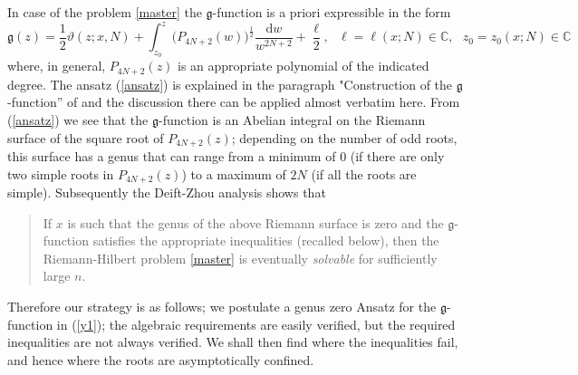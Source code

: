 \documentclass[10pt,reqno,oneside]{amsart}
\def \gg{{\mathfrak g}}
\renewcommand{\d}{{\mathrm d}}
\numberwithin{equation}{section}
\def\eqref#1{(\ref{#1})}
\begin{document}
In case of the problem \ref{master} the $\gg$-function is a priori expressible in the form 
\begin{equation}\label{ansatz}
	\gg(z) = \frac 12 \vartheta(z;x,N) + \int_{z_0} ^z \big(P_{4N+2}(w)\big)^{\frac{1}{2}}\frac{\d w}{w^{2N+2}}+\frac{\ell}{2},\ \ \ \ell=\ell(x;N)\in\mathbb{C},\ \ \ z_0=z_0(x;N)\in\mathbb{C}
\end{equation}
where, in general, $P_{4N+2}(z)$ is an appropriate polynomial of the indicated degree. The ansatz \eqref{ansatz} is explained in the paragraph "Construction of the $\gg$-function'' of \cite{BB} and the discussion there can be applied almost verbatim here. From \eqref{ansatz} we see that the $\gg$-function is an Abelian integral on the Riemann surface of the square root of $P_{4N+2}(z)$; depending on the number of odd roots, this surface has a genus that can range from a minimum of $0$ (if there are only two simple roots in $P_{4N+2}(z)$) to a maximum of $2N$ (if all the roots are simple). Subsequently the Deift-Zhou analysis shows that 
\begin{quote}
If $x$ is such that the genus of the above Riemann surface is zero and the $\gg$-function satisfies the appropriate inequalities (recalled below), then the Riemann-Hilbert problem \ref{master} is eventually {\em solvable} for sufficiently large $n$.
\end{quote}
Therefore our strategy is as follows; 
we postulate a genus zero  Ansatz for the $\gg$-function in \eqref{y1}; the algebraic requirements are easily verified, but the required inequalities are not always verified. We shall then find where the inequalities fail, and hence where the roots are asymptotically confined.\smallskip
 
\end{document}
